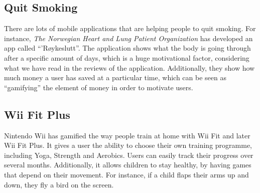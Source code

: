 \subsection{Quit Smoking}
There are lots of mobile applications that are helping people to quit smoking. For instance, \emph{The Norwegian Heart and Lung Patient Organization} has developed an app called ``'R\o ykeslutt''. The application shows what the body is going through after a specific amount of days, which is a huge motivational factor, considering what we have read in the reviews of the application. Additionally, they show how much money a user has saved at a particular time, which can be seen as ``gamifying'' the element of money in order to motivate users.  


\subsection{Wii Fit Plus}
Nintendo Wii has gamified the way people train at home with Wii Fit and later Wii Fit Plus. It gives a user the ability to choose their own training programme, including Yoga, Strength and Aerobics. Users can easily track their progress over several months. Additionally, it allows children to stay healthy, by having games that depend on their movement. For instance, if a child flaps their arms up and down, they fly a bird on the screen.    
 